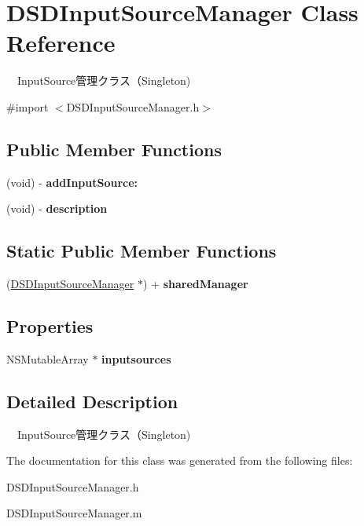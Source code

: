 \hypertarget{interface_d_s_d_input_source_manager}{\section{D\-S\-D\-Input\-Source\-Manager Class Reference}
\label{interface_d_s_d_input_source_manager}
}


　\-Input\-Source管理クラス（\-Singleton)  




{\ttfamily \#import $<$D\-S\-D\-Input\-Source\-Manager.\-h$>$}

\subsection*{Public Member Functions}
\begin{DoxyCompactItemize}
\item 
\hypertarget{interface_d_s_d_input_source_manager_a6e2b3b5774f770406292174af54b5938}{(void) -\/ {\bfseries add\-Input\-Source\-:}}\label{interface_d_s_d_input_source_manager_a6e2b3b5774f770406292174af54b5938}

\item 
\hypertarget{interface_d_s_d_input_source_manager_a1278b69bb04c3624a2789e1347ab242d}{(void) -\/ {\bfseries description}}\label{interface_d_s_d_input_source_manager_a1278b69bb04c3624a2789e1347ab242d}

\end{DoxyCompactItemize}
\subsection*{Static Public Member Functions}
\begin{DoxyCompactItemize}
\item 
\hypertarget{interface_d_s_d_input_source_manager_afd7f7595df91959f1aad47838b585fa0}{(\hyperlink{interface_d_s_d_input_source_manager}{D\-S\-D\-Input\-Source\-Manager} $\ast$) + {\bfseries shared\-Manager}}\label{interface_d_s_d_input_source_manager_afd7f7595df91959f1aad47838b585fa0}

\end{DoxyCompactItemize}
\subsection*{Properties}
\begin{DoxyCompactItemize}
\item 
\hypertarget{interface_d_s_d_input_source_manager_a24269ed1a431d4ff60d3894f6763d7fa}{N\-S\-Mutable\-Array $\ast$ {\bfseries inputsources}}\label{interface_d_s_d_input_source_manager_a24269ed1a431d4ff60d3894f6763d7fa}

\end{DoxyCompactItemize}


\subsection{Detailed Description}
　\-Input\-Source管理クラス（\-Singleton) 

The documentation for this class was generated from the following files\-:\begin{DoxyCompactItemize}
\item 
D\-S\-D\-Input\-Source\-Manager.\-h\item 
D\-S\-D\-Input\-Source\-Manager.\-m\end{DoxyCompactItemize}
